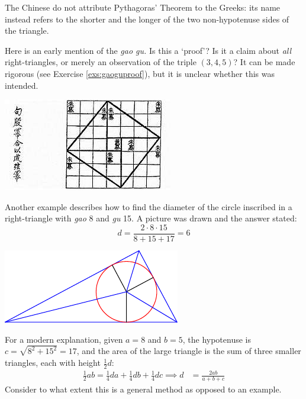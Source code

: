The Chinese do not attribute Pythagoras' Theorem to the Greeks: its name instead refers to the shorter and the longer of the two non-hypotenuse sides of the triangle.\par
\begin{minipage}[t]{0.52\linewidth}\vspace{0pt}
Here is an early mention of the \emph{gao gu.} Is this a `proof'? Is it a claim about \emph{all} right-triangles, or merely an observation of the triple $(3,4,5)$? It can be made rigorous (see Exercise \ref{exs:gaoguproof}), but it is unclear whether this was intended.
\end{minipage}\hfill\begin{minipage}[t]{0.44\linewidth}\vspace{0pt}
\flushright\includegraphics[scale=0.75]{Chinese_pythagoras.jpg}
\end{minipage}\bigbreak


\begin{minipage}[t]{0.7\linewidth}\vspace{0pt}
Another example describes how to find the diameter of the circle inscribed in a right-triangle with \emph{gao} 8 and \emph{gu} 15.
A picture was drawn and the answer stated:
\[d=\frac{2\cdot 8\cdot 15}{8+15+17}=6\]
\end{minipage}\begin{minipage}[t]{0.3\linewidth}\vspace{0pt}
\flushright\includegraphics{china-inscribed}
\end{minipage}\medbreak
For a modern explanation, given $a=8$ and $b=5$, the hypotenuse is $c=\sqrt{8^2+15^2}=17$, and the area of the large triangle is the sum of three smaller triangles, each with height $\frac 12 d$:
\begin{align*}
\frac 12 ab=\frac 14da+\frac 14db+\frac 14dc\implies d&=\frac{2ab}{a+b+c}
\end{align*}
Consider to what extent this is a general method as opposed to an example. \goodbreak






